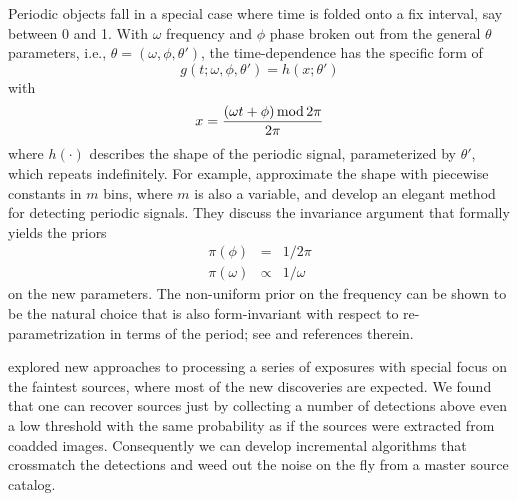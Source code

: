 Periodic objects fall in a special case where time is folded onto a fix interval, say between 0 and 1. With $\omega$ frequency and $\phi$ phase broken out from the general $\theta$ parameters, i.e., \mbox{$\theta\!=\!(\omega,\phi,\theta')$}, the time-dependence has the specific form of
%
\begin{equation}
g(t;\omega,\phi,\theta') = h(x;\theta')
\end{equation}
with
\begin{equation}
x = \frac{ (\omega{}t+\phi)\,{\rm{}mod}\,{2\pi} }{2\pi}
\end{equation}
%
where $h(\cdot)$ describes the shape of the periodic signal, parameterized by $\theta'$, which repeats indefinitely.
%
For example, \citet{gregory} approximate the shape with piecewise constants in $m$ bins, where $m$ is also a variable, and develop an elegant method for detecting periodic signals.
%
They discuss the invariance argument that formally yields the priors
\begin{eqnarray}
\pi(\phi) & = & 1 \big/ 2\pi \\
\pi(\omega)& \propto & 1 \big/ \omega
\end{eqnarray}
on the new parameters.
%
The non-uniform prior on the frequency can be shown to be the natural choice that is also form-invariant with respect to re-parametrization in terms of the period; see \citet{gregory} and references therein.


explored new approaches to processing a series of exposures with special focus on the faintest sources, where most of the new discoveries are expected.
%
We found that one can recover sources just by collecting a number of detections above even a low threshold with the same probability as if the sources were extracted from coadded images. Consequently we can develop incremental algorithms that crossmatch the detections and weed out the noise on the fly from a master source catalog.
